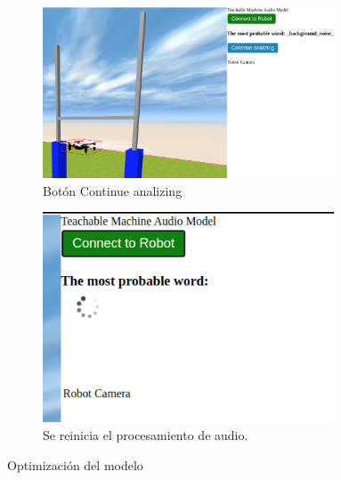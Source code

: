 \begin{figure}[H]
  \begin{subfigure}[b]{0.5\textwidth}
  \centering
    \includegraphics[width=0.95\textwidth, height=0.7\textwidth]{chapters/images/optimizacionaudio.png}
    \caption{Botón Continue analizing }
    \label{fig:f1}
  \end{subfigure}
  \hfill
  \begin{subfigure}[b]{0.5\textwidth}
  \centering
    \includegraphics[width=0.95\textwidth, height=0.7\textwidth]{chapters/images/optimizacionaudio2.png}
	\caption{Se reinicia el procesamiento de audio.}    
    \label{fig:f2}
 
  \end{subfigure}
  \caption{Optimización del modelo }
\end{figure}




